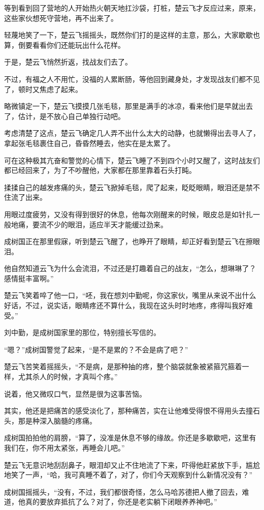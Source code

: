 等到看到回了营地的人开始热火朝天地扛沙袋，打桩，楚云飞才反应过来，原来，这些家伙想死守营地，再不出来了。

轻蔑地笑了一下，楚云飞摇摇头，既然你们打的是这样的主意，那么，大家歇歇也算，倒要看看你们还能玩出什么花样。

于是，楚云飞悄然折返，找战友们去了。

不过，有福之人不用忙，没福的人累断肠，等他回到藏身处，才发现战友们都不见了，顿时又焦虑了起来。

略微镇定一下，楚云飞摸摸几张毛毯，那里是满手的冰凉，看来他们是早就出去了，估计，是不放心自己单独行动吧。

考虑清楚了这点，楚云飞确定几人弄不出什么太大的动静，也就懒得出去寻人了，拿起张毛毯裹住自己，昏昏然睡去，他实在是太累了。

可在这种极其亢奋和警觉的心情下，楚云飞睡了不到四个小时又醒了，这时战友们都已经回来了，为了不吵醒他，大家都在那里靠着石头打盹。

揉揉自己的越发疼痛的头，楚云飞掀掉毛毯，爬了起来，眨眨眼睛，眼泪还是禁不住流了出来。

用眼过度疲劳，又没有得到很好的休息，他每次刚醒来的时候，眼皮总是如针扎一般地痛，要流不少的眼泪，适应半天才能缓过劲来。

成树国正在那里假寐，听到楚云飞醒了，也睁开了眼睛，却正好看到楚云飞在擦眼泪。

他自然知道云飞为什么会流泪，不过还是打趣着自己的战友，“怎么，想琳琳了？感情挺丰富啊。”

楚云飞笑着啐了他一口，“呸，我在想刘中勤呢，你这家伙，嘴里从来说不出什么好话，不过，说实话，眼睛疼还不算什么，我现在这头时时地疼，疼得叫我好难受。”

刘中勤，是成树国家里的那位，特别擅长写信的。

“嗯？”成树国警觉了起来，“是不是累的？不会是病了吧？”

楚云飞苦笑着摇摇头，“不是病，是那种抽的疼，整个脑袋就象被紧箍咒箍着一样，尤其杀人的时候，才真叫个疼。”

说着，他又微叹口气，显然是很为这事苦恼。

其实，他还是把痛苦的感受淡化了，那种痛苦，实在让他难受得恨不得用头去撞石头，那是种深入脑髓的疼痛。

成树国拍拍他的肩膀，“算了，没准是休息不够的缘故。你还是多歇歇吧，这里有我们在，你不用太紧张，再睡会儿吧。”

楚云飞无意识地刮刮鼻子，眼泪却又止不住地流了下来，吓得他赶紧放下手，尴尬地笑了一声，“哈，我可真睡不着了，对了，你们今天观察到什么新情况没有？”

成树国摇摇头，“没有，不过，我们都很奇怪，怎么马哈苏德把人撤了回去，难道，他真的要放弃抵抗了么？对了，你还是老实躺下闭眼养养神吧。”

